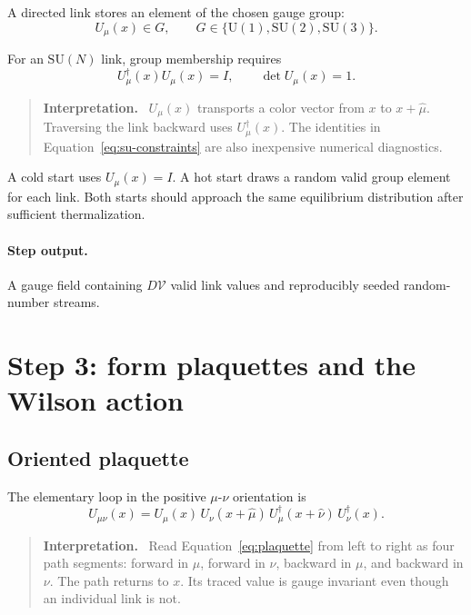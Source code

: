\documentclass[11pt]{article}
\newcommand{\Uone}{\mathrm{U}(1)}
\newcommand{\SUN}[1]{\mathrm{SU}(#1)}
\newcommand{\Vlat}{\mathcal{V}}
\newenvironment{interpretation}
  {\begin{quote}\small\noindent\textbf{Interpretation.}\ }
  {\end{quote}}
\begin{document}
A directed link stores an element of the chosen gauge group:
\begin{equation}
  U_\mu(x)\in G,\qquad
  G\in\{\Uone,\SUN{2},\SUN{3}\}.
  \label{eq:gauge-link}
\end{equation}

For an \(\SUN{N}\) link, group membership requires
\begin{equation}
  U_\mu^\dagger(x)U_\mu(x)=I,
  \qquad
  \det U_\mu(x)=1.
  \label{eq:su-constraints}
\end{equation}

\begin{interpretation}
\(U_\mu(x)\) transports a color vector from \(x\) to \(x+\hat\mu\).
Traversing the link backward uses \(U_\mu^\dagger(x)\). The identities in
Equation~\eqref{eq:su-constraints} are also inexpensive numerical diagnostics.
\end{interpretation}

A cold start uses \(U_\mu(x)=I\). A hot start draws a random valid group
element for each link. Both starts should approach the same equilibrium
distribution after sufficient thermalization.

\paragraph{Step output.}
A gauge field containing \(D\Vlat\) valid link values and reproducibly seeded
random-number streams.

\section{Step 3: form plaquettes and the Wilson action}

\subsection{Oriented plaquette}

The elementary loop in the positive \(\mu\)-\(\nu\) orientation is
\begin{equation}
  U_{\mu\nu}(x)=
  U_\mu(x)\,
  U_\nu(x+\hat\mu)\,
  U_\mu^\dagger(x+\hat\nu)\,
  U_\nu^\dagger(x).
  \label{eq:plaquette}
\end{equation}

\begin{interpretation}
Read Equation~\eqref{eq:plaquette} from left to right as four path segments:
forward in \(\mu\), forward in \(\nu\), backward in \(\mu\), and backward in
\(\nu\). The path returns to \(x\). Its traced value is gauge invariant even
though an individual link is not.
\end{interpretation}
\end{document}

